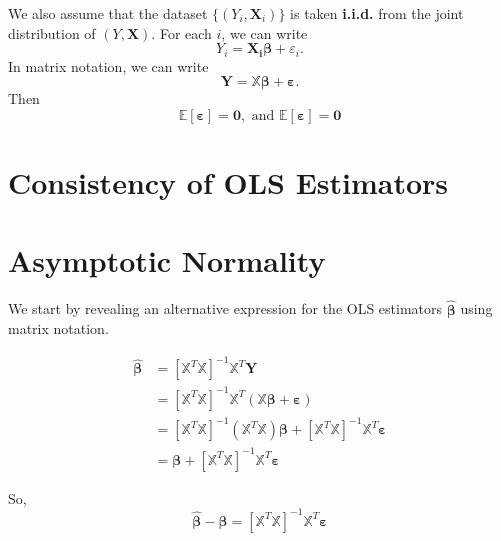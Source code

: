 \documentclass[
]{book}
\theoremstyle{definition}
\theoremstyle{definition}
\theoremstyle{definition}
\theoremstyle{definition}
\theoremstyle{remark}
\begin{document}
We also assume that the dataset \(\{(Y_i,{\boldsymbol{X}}_i)\}\) is taken \textbf{i.i.d.} from the joint distribution of \((Y,{\boldsymbol{X}})\). For each \(i\), we can write
\[
Y_i={\boldsymbol{X_i}}{\boldsymbol{\beta}}+\varepsilon_i.
\]
In matrix notation, we can write
\[
{\boldsymbol{Y}}={\mathbb{X}}{\boldsymbol{\beta}}+{\boldsymbol{\varepsilon}}.
\]
Then
\[{\mathbb{E}\left[ {\boldsymbol{\varepsilon}} \right]}={\boldsymbol{0}},\text{ and } {\mathbb{E}\left[ {\boldsymbol{\varepsilon}} \right]}={\boldsymbol{0}}\]

\hypertarget{consistency-of-ols-estimators}{%
\section{Consistency of OLS Estimators}\label{consistency-of-ols-estimators}}

\hypertarget{asymptotic-normality}{%
\section{Asymptotic Normality}\label{asymptotic-normality}}

We start by revealing an alternative expression for the OLS estimators \(\widehat{{\boldsymbol{\beta}}}\) using matrix notation.

\[
\begin{aligned}
\widehat{{\boldsymbol{\beta}}}
&=\left[{\mathbb{X}}^T{\mathbb{X}}\right]^{-1}{\mathbb{X}}^T{\boldsymbol{Y}} \\
&=\left[{\mathbb{X}}^T{\mathbb{X}}\right]^{-1}{\mathbb{X}}^T({\mathbb{X}}{\boldsymbol{\beta}}+{\boldsymbol{\varepsilon}}) \\
&=\left[{\mathbb{X}}^T{\mathbb{X}}\right]^{-1}({\mathbb{X}}^T{\mathbb{X}}){\boldsymbol{\beta}}+
\left[{\mathbb{X}}^T{\mathbb{X}}\right]^{-1}{\mathbb{X}}^T{\boldsymbol{\varepsilon}} \\
&={\boldsymbol{\beta}} + \left[{\mathbb{X}}^T{\mathbb{X}}\right]^{-1}{\mathbb{X}}^T{\boldsymbol{\varepsilon}}
\end{aligned}
\]

So,
\begin{equation}
\widehat{{\boldsymbol{\beta}}}-{\boldsymbol{\beta}} = \left[{\mathbb{X}}^T{\mathbb{X}}\right]^{-1}{\mathbb{X}}^T{\boldsymbol{\varepsilon}}
\label{eq:beta}
\end{equation}
\end{document}
